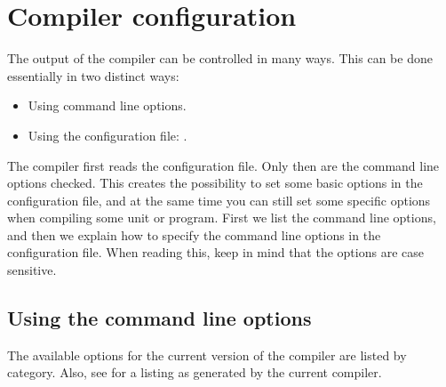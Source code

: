 \chapter{Compiler configuration}
\label{ch:CompilerConfiguration}

The output of the compiler can be controlled in many ways. This can be done
essentially in two distinct ways:
\begin{itemize}
\item Using command line options.
\item Using the configuration file: .
\end{itemize}
The compiler first reads the configuration file. Only then are the command line
options checked. This creates the possibility to set some basic options
in the configuration file, and at the same time you can still set some
specific options when compiling some unit or program. First we list the
command line options, and then we explain how to specify the command
line options in the configuration file. When reading this, keep in mind
that the options are case sensitive. 


\section{Using the command line options}

The available options for the current version of the compiler are listed by
category. Also, see  for a listing as generated by 
the current compiler.

%
%


